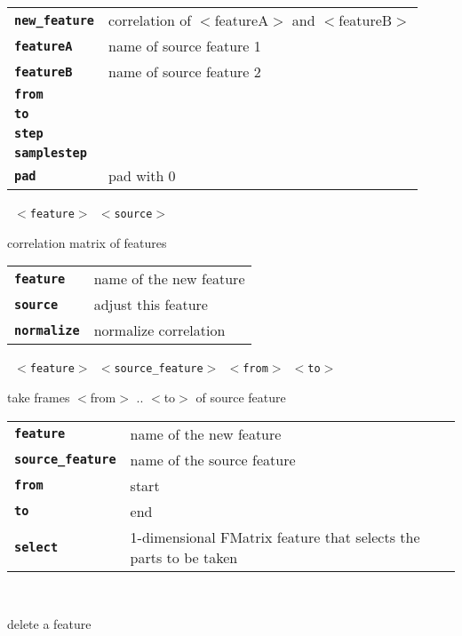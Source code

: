 \begin{description}
\begin{description}
      \begin{tabular}{ll}
 \texttt{\textbf{new\_feature}} &  correlation of $<$featureA$>$ and $<$featureB$>$ \\
 \texttt{\textbf{featureA}} &     name of source feature 1 \\
 \texttt{\textbf{featureB}} &     name of source feature 2 \\
 \texttt{\textbf{from}} &            \\
 \texttt{\textbf{to}} &              \\
 \texttt{\textbf{step}} &            \\
 \texttt{\textbf{samplestep}} &      \\
 \texttt{\textbf{pad}} &           pad with 0  \\
      \end{tabular}
       \texttt{ $<$feature$>$ $<$source$>$ } \

        correlation matrix of features

      \begin{tabular}{ll}
 \texttt{\textbf{feature}} &   name of the new feature \\
 \texttt{\textbf{source}} &    adjust this feature \\
 \texttt{\textbf{normalize}} &  normalize correlation \\
      \end{tabular}
       \texttt{ $<$feature$>$ $<$source\_feature$>$ $<$from$>$ $<$to$>$ } \

        take frames $<$from$>$ .. $<$to$>$ of source feature

      \begin{tabular}{ll}
 \texttt{\textbf{feature}} &         name of the new feature \\
 \texttt{\textbf{source\_feature}} &  name of the source feature \\
 \texttt{\textbf{from}} &            start  \\
 \texttt{\textbf{to}} &              end  \\
 \texttt{\textbf{select}} &           1-dimensional FMatrix feature that selects the parts to be taken \\
      \end{tabular}
       \texttt{} \

        delete a feature


\end{description}
\end{description}
